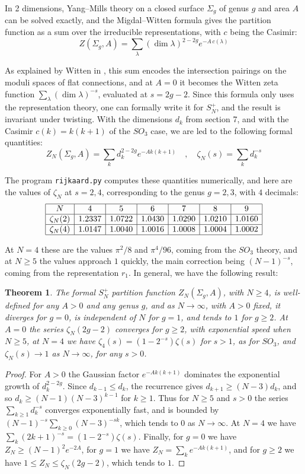 \documentclass[11pt]{amsart}
\newtheorem{theorem}{Theorem}[section]
\theoremstyle{definition}
\begin{document}
In 2 dimensions, Yang--Mills theory on a closed surface $\Sigma_g$ of genus $g$ and area $A$ can be solved exactly, and the Migdal--Witten formula \cite{mig,wit} gives the partition function as a sum over the irreducible representations, with $c$ being the Casimir:
$$Z(\Sigma_g,A)=\sum_\lambda(\dim\lambda)^{2-2g}e^{-A\,c(\lambda)}$$

As explained by Witten in \cite{wi2}, this sum encodes the intersection pairings on the moduli spaces of flat connections, and at $A=0$ it becomes the Witten zeta function $\sum_\lambda(\dim\lambda)^{-s}$, evaluated at $s=2g-2$. Since this formula only uses the representation theory, one can formally write it for $S_N^+$, and the result is invariant under twisting. With the dimensions $d_k$ from section 7, and with the Casimir $c(k)=k(k+1)$ of the $SO_3$ case, we are led to the following formal quantities:
$$Z_N(\Sigma_g,A)=\sum_kd_k^{2-2g}e^{-Ak(k+1)}\quad,\quad\zeta_N(s)=\sum_kd_k^{-s}$$

The program {\tt rijkaard.py} computes these quantities numerically, and here are the values of $\zeta_N$ at $s=2,4$, corresponding to the genus $g=2,3$, with $4$ decimals:
$$\begin{array}{|c|c|c|c|c|c|c|}
\hline
N&4&5&6&7&8&9\\
\hline
\zeta_N(2)&1.2337&1.0722&1.0430&1.0290&1.0210&1.0160\\
\hline
\zeta_N(4)&1.0147&1.0040&1.0016&1.0008&1.0004&1.0002\\
\hline
\end{array}$$

At $N=4$ these are the values $\pi^2/8$ and $\pi^4/96$, coming from the $SO_3$ theory, and at $N\geq5$ the values approach $1$ quickly, the main correction being $(N-1)^{-s}$, coming from the representation $r_1$. In general, we have the following result:

\begin{theorem}
The formal $S_N^+$ partition function $Z_N(\Sigma_g,A)$, with $N\geq4$, is well-defined for any $A>0$ and any genus $g$, and as $N\to\infty$, with $A>0$ fixed, it diverges for $g=0$, is independent of $N$ for $g=1$, and tends to $1$ for $g\geq2$. At $A=0$ the series $\zeta_N(2g-2)$ converges for $g\geq2$, with exponential speed when $N\geq5$, at $N=4$ we have $\zeta_4(s)=(1-2^{-s})\zeta(s)$ for $s>1$, as for $SO_3$, and $\zeta_N(s)\to1$ as $N\to\infty$, for any $s>0$.
\end{theorem}

\begin{proof}
For $A>0$ the Gaussian factor $e^{-Ak(k+1)}$ dominates the exponential growth of $d_k^{2-2g}$. Since $d_{k-1}\leq d_k$, the recurrence gives $d_{k+1}\geq(N-3)d_k$, and so $d_k\geq(N-1)(N-3)^{k-1}$ for $k\geq1$. Thus for $N\geq5$ and $s>0$ the series $\sum_{k\geq1}d_k^{-s}$ converges exponentially fast, and is bounded by $(N-1)^{-s}\sum_{k\geq0}(N-3)^{-sk}$, which tends to $0$ as $N\to\infty$. At $N=4$ we have $\sum_k(2k+1)^{-s}=(1-2^{-s})\zeta(s)$. Finally, for $g=0$ we have $Z_N\geq(N-1)^2e^{-2A}$, for $g=1$ we have $Z_N=\sum_ke^{-Ak(k+1)}$, and for $g\geq2$ we have $1\leq Z_N\leq\zeta_N(2g-2)$, which tends to $1$.
\end{proof}
\end{document}
